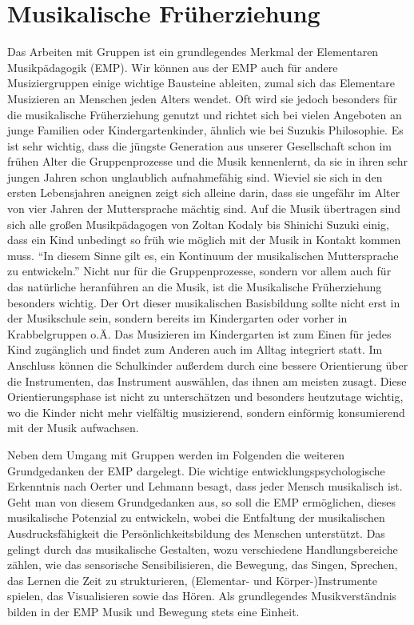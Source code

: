 \section{Musikalische Früherziehung}

Das Arbeiten mit Gruppen ist ein grundlegendes Merkmal der Elementaren
Musikpädagogik (EMP). Wir können aus der EMP auch für andere Musiziergruppen
einige wichtige Bausteine ableiten, zumal sich das Elementare Musizieren an
Menschen jeden Alters wendet.
\autocite[226]{busch:grundwissen_instrumentalpaedagogik} Oft wird sie jedoch
besonders für die musikalische Früherziehung genutzt und richtet sich bei vielen
Angeboten an junge Familien oder Kindergartenkinder, ähnlich wie bei Suzukis
Philosophie. Es ist sehr wichtig, dass die jüngste Generation aus unserer
Gesellschaft schon im frühen Alter die Gruppenprozesse und die Musik
kennenlernt, da sie in ihren sehr jungen Jahren schon unglaublich aufnahmefähig
sind. Wieviel sie sich in den ersten Lebensjahren aneignen zeigt sich alleine
darin, dass sie ungefähr im Alter von vier Jahren der Muttersprache mächtig
sind. Auf die Musik übertragen sind sich alle großen Musikpädagogen von Zoltan
Kodaly bis Shinichi Suzuki einig, dass ein Kind unbedingt so früh wie möglich
mit der Musik in Kontakt kommen muss. \enquote{In diesem Sinne gilt es, ein
Kontinuum der musikalischen Muttersprache zu entwickeln.}
\autocite[45]{ernst:die_zukunftsfaehige_musikschule} Nicht nur für die
Gruppenprozesse, sondern vor allem auch für das natürliche heranführen an die
Musik, ist die Musikalische Früherziehung besonders wichtig. Der Ort dieser
musikalischen Basisbildung sollte nicht erst in der Musikschule sein, sondern
bereits im Kindergarten oder vorher in Krabbelgruppen o.Ä.
\autocite[43]{ernst:die_zukunftsfaehige_musikschule}
Das Musizieren im Kindergarten ist zum Einen für jedes Kind zugänglich und
findet zum Anderen auch im Alltag integriert statt. Im Anschluss können die
Schulkinder außerdem durch eine bessere Orientierung über die Instrumenten, das
Instrument auswählen, das ihnen am meisten zusagt. Diese Orientierungsphase ist
nicht zu unterschätzen und besonders heutzutage wichtig, wo die Kinder nicht
mehr vielfältig musizierend, sondern einförmig konsumierend mit der Musik
aufwachsen.\autocite[37]{ernst:die_zukunftsfaehige_musikschule}

Neben dem Umgang mit Gruppen werden im Folgenden die weiteren Grundgedanken der
EMP dargelegt. Die wichtige entwicklungspsychologische Erkenntnis nach Oerter
und Lehmann besagt, dass jeder Mensch musikalisch
ist.\autocite[88]{musikalische_begabung} Geht man von diesem Grundgedanken aus,
so soll die EMP ermöglichen, dieses musikalische Potenzial zu entwickeln, wobei
die Entfaltung der musikalischen Ausdrucksfähigkeit die Persönlichkeitsbildung
des Menschen unterstützt. Das gelingt durch das musikalische Gestalten, wozu
verschiedene Handlungsbereiche zählen, wie das sensorische Sensibilisieren, die
Bewegung, das Singen, Sprechen, das Lernen die Zeit zu strukturieren,
(Elementar-  und Körper-)Instrumente spielen, das Visualisieren sowie das Hören.
\autocite[227]{busch:grundwissen_instrumentalpaedagogik} Als grundlegendes
Musikverständnis bilden in der EMP Musik und Bewegung stets eine Einheit.

